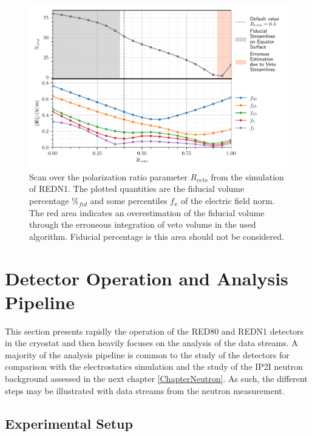 \begin{figure}
\centering
\includegraphics[scale=1]{Figures/ElectrodesExperimental/redn1_scan_veto_ratio.pdf}
\caption{Scan over the polarization ratio parameter $R_{veto}$ from the simulation of REDN1. The plotted quantities are the fiducial volume percentage $\%_{fid}$ and some percentiles $f_x$ of the electric field norm. The red area indicates an overestimation of the fiducial volume through the erroneous integration of veto volume in the used algorithm. Fiducial percentage is this area should not be considered.}
\label{fig:redn1-scan}
\end{figure}


\section{Detector Operation and Analysis Pipeline}

This section presents rapidly the operation of the RED80 and REDN1 detectors in the cryostat and then heavily focuses on the analysis of the data streams. A majority of the analysis pipeline is common to the study of the detectors for comparison with the electrostatics simulation and the study of the IP2I neutron background assessed in the next chapter \ref{ChapterNeutron}. As such, the different steps may be illustrated with data streams from the neutron measurement.

\subsection{Experimental Setup}

